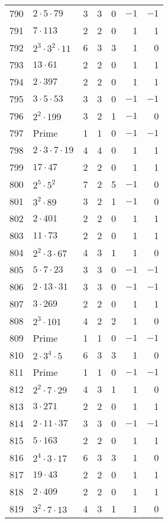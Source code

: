 \documentclass[12pt]{article}
\begin{document}
\begin{tabular}{|r|l|r|r|r|r|r|}
790 & $2 \cdot 5 \cdot 79$ & 3 & 3 & 0 & $-1$ & $-1$ \\
791 & $7 \cdot 113$ & 2 & 2 & 0 & 1 & 1 \\
792 & $2^3 \cdot 3^2 \cdot 11$ & 6 & 3 & 3 & 1 & 0 \\
793 & $13 \cdot 61$ & 2 & 2 & 0 & 1 & 1 \\
794 & $2 \cdot 397$ & 2 & 2 & 0 & 1 & 1 \\
795 & $3 \cdot 5 \cdot 53$ & 3 & 3 & 0 & $-1$ & $-1$ \\
796 & $2^2 \cdot 199$ & 3 & 2 & 1 & $-1$ & 0 \\
797 & Prime & 1 & 1 & 0 & $-1$ & $-1$ \\
798 & $2 \cdot 3 \cdot 7 \cdot 19$ & 4 & 4 & 0 & 1 & 1 \\
799 & $17 \cdot 47$ & 2 & 2 & 0 & 1 & 1 \\
800 & $2^5 \cdot 5^2$ & 7 & 2 & 5 & $-1$ & 0 \\
801 & $3^2 \cdot 89$ & 3 & 2 & 1 & $-1$ & 0 \\
802 & $2 \cdot 401$ & 2 & 2 & 0 & 1 & 1 \\
803 & $11 \cdot 73$ & 2 & 2 & 0 & 1 & 1 \\
804 & $2^2 \cdot 3 \cdot 67$ & 4 & 3 & 1 & 1 & 0 \\
805 & $5 \cdot 7 \cdot 23$ & 3 & 3 & 0 & $-1$ & $-1$ \\
806 & $2 \cdot 13 \cdot 31$ & 3 & 3 & 0 & $-1$ & $-1$ \\
807 & $3 \cdot 269$ & 2 & 2 & 0 & 1 & 1 \\
808 & $2^3 \cdot 101$ & 4 & 2 & 2 & 1 & 0 \\
809 & Prime & 1 & 1 & 0 & $-1$ & $-1$ \\
810 & $2 \cdot 3^4 \cdot 5$ & 6 & 3 & 3 & 1 & 0 \\
811 & Prime & 1 & 1 & 0 & $-1$ & $-1$ \\
812 & $2^2 \cdot 7 \cdot 29$ & 4 & 3 & 1 & 1 & 0 \\
813 & $3 \cdot 271$ & 2 & 2 & 0 & 1 & 1 \\
814 & $2 \cdot 11 \cdot 37$ & 3 & 3 & 0 & $-1$ & $-1$ \\
815 & $5 \cdot 163$ & 2 & 2 & 0 & 1 & 1 \\
816 & $2^4 \cdot 3 \cdot 17$ & 6 & 3 & 3 & 1 & 0 \\
817 & $19 \cdot 43$ & 2 & 2 & 0 & 1 & 1 \\
818 & $2 \cdot 409$ & 2 & 2 & 0 & 1 & 1 \\
819 & $3^2 \cdot 7 \cdot 13$ & 4 & 3 & 1 & 1 & 0 \\

\end{tabular}
\end{document}
